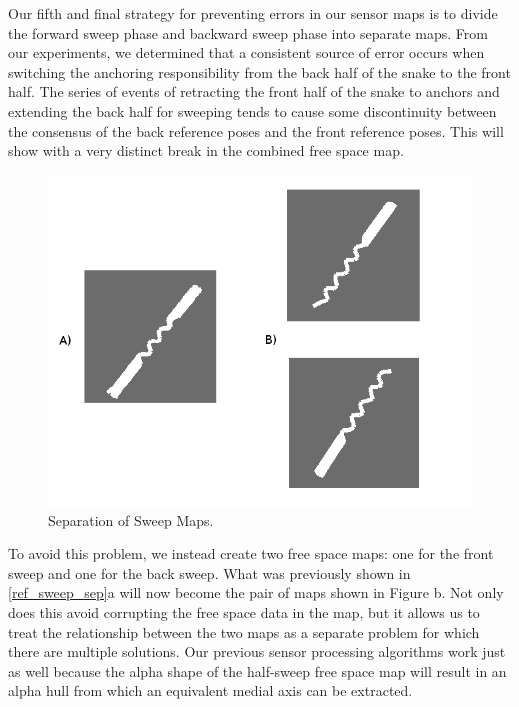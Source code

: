 Our fifth and final strategy for preventing errors in our sensor maps is to divide the forward sweep phase and backward sweep phase into separate maps. From our experiments, we determined that a consistent source of error occurs when switching the anchoring responsibility from the back half of the snake to the front half. The series of events of retracting the front half of the snake to anchors and extending the back half for sweeping tends to cause some discontinuity between the consensus of the back reference poses and the front reference poses. This will show with a very distinct break in the combined free space map.

\begin{figure}[htbp]
\centering
\includegraphics[keepaspectratio,width=400pt,height=0.75\textheight]{4_sweepmap_1.png}
\caption{Separation of Sweep Maps.}
\label{ref_sweep_sep}
\end{figure}



To avoid this problem, we instead create two free space maps: one for the front sweep and one for the back sweep. What was previously shown in \autoref{ref_sweep_sep}a will now become the pair of maps shown in Figure b. Not only does this avoid corrupting the free space data in the map, but it allows us to treat the relationship between the two maps as a separate problem for which there are multiple solutions. Our previous sensor processing algorithms work just as well because the alpha shape of the half-sweep free space map will result in an alpha hull from which an equivalent medial axis can be extracted. 

